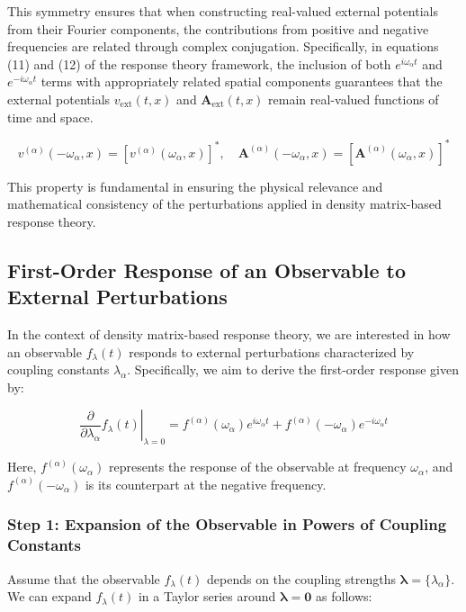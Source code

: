 \documentclass[12pt]{article}
\begin{document}
This symmetry ensures that when constructing real-valued external potentials from their Fourier components, the contributions from positive and negative frequencies are related through complex conjugation. Specifically, in equations (11) and (12) of the response theory framework, the inclusion of both \( e^{i \omega_{\alpha} t} \) and \( e^{-i \omega_{\alpha} t} \) terms with appropriately related spatial components guarantees that the external potentials \( v_{\text{ext}}(t, x) \) and \( \mathbf{A}_{\text{ext}}(t, x) \) remain real-valued functions of time and space.

\[
v^{(\alpha)}(-\omega_{\alpha}, x) = [v^{(\alpha)}(\omega_{\alpha}, x)]^*, \quad \mathbf{A}^{(\alpha)}(-\omega_{\alpha}, x) = [\mathbf{A}^{(\alpha)}(\omega_{\alpha}, x)]^*
\]

This property is fundamental in ensuring the physical relevance and mathematical consistency of the perturbations applied in density matrix-based response theory.

\subsection{First-Order Response of an Observable to External Perturbations}
\label{sec:firstOrderResponse}


In the context of density matrix-based response theory, we are interested in how an observable \( f_{\lambda}(t) \) responds to external perturbations characterized by coupling constants \( \lambda_{\alpha} \). Specifically, we aim to derive the first-order response given by:

\begin{equation}
\left.\frac{\partial}{\partial \lambda_{\alpha}} f_{\lambda}(t)\right|_{\lambda=0} = f^{(\alpha)}(\omega_{\alpha}) e^{i \omega_{\alpha} t} + f^{(\alpha)}(-\omega_{\alpha}) e^{-i \omega_{\alpha} t} 
\end{equation}

Here, \( f^{(\alpha)}(\omega_{\alpha}) \) represents the response of the observable at frequency \( \omega_{\alpha} \), and \( f^{(\alpha)}(-\omega_{\alpha}) \) is its counterpart at the negative frequency.

\subsubsection*{Step 1: Expansion of the Observable in Powers of Coupling Constants}

Assume that the observable \( f_{\lambda}(t) \) depends on the coupling strengths \( \boldsymbol{\lambda} = \{\lambda_{\alpha}\} \). We can expand \( f_{\lambda}(t) \) in a Taylor series around \( \boldsymbol{\lambda} = \mathbf{0} \) as follows:
\end{document}
